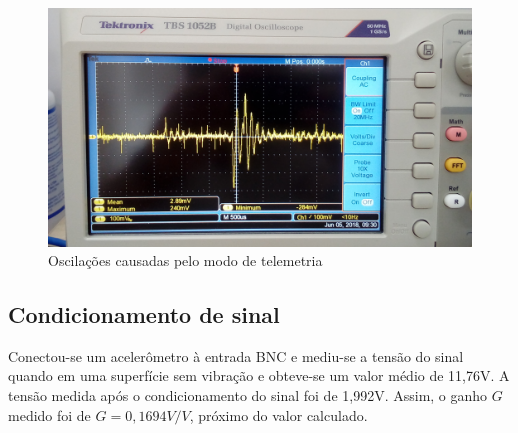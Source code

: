 \documentclass[11pt]{abntex2}
\begin{document}
					\begin{figure}[!ht]
						\centering
						\includegraphics[width = \linewidth]{../Fotos/osc33.jpg}
						\caption{Oscilações causadas pelo modo de telemetria}
					\end{figure}

				\subsection{Condicionamento de sinal}
					Conectou-se um acelerômetro à entrada BNC e mediu-se a
					tensão do sinal quando em uma superfície sem vibração e
					obteve-se um valor médio de 11,76V. A tensão medida após o
					condicionamento do sinal foi de 1,992V. Assim, o ganho $G$
					medido foi de $G = 0,1694V/V$, próximo do valor calculado.
\end{document}
